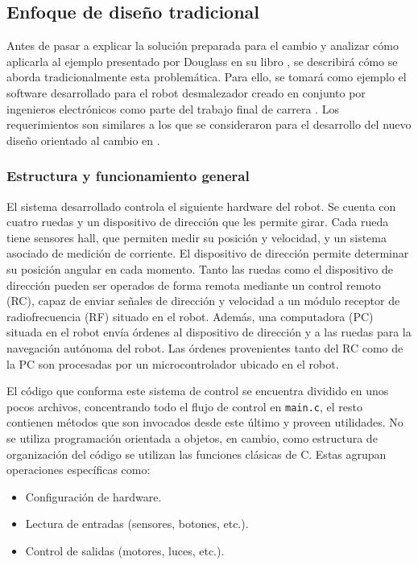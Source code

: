 \subsection*{Enfoque de diseño tradicional}

Antes de pasar a explicar la solución preparada para el cambio y analizar cómo aplicarla al ejemplo presentado por Douglass en su libro \cite{douglass}, se describirá cómo se aborda tradicionalmente esta problemática. Para ello, se tomará como ejemplo el software desarrollado para el robot desmalezador creado en conjunto por ingenieros electrónicos como parte del trabajo final de carrera \cite{disenioViejo1, disenioViejo2}. Los requerimientos son similares a los que se consideraron para el desarrollo del nuevo diseño orientado al cambio en \cite{paperPomponio}.

\subsubsection*{Estructura y funcionamiento general}

El sistema desarrollado controla el siguiente hardware del robot. Se cuenta con cuatro ruedas y un dispositivo de dirección que les permite girar. Cada rueda tiene sensores \gls{hall}, que permiten medir su posición y velocidad, y un sistema asociado de medición de corriente. El dispositivo de dirección permite determinar su posición angular en cada momento. Tanto las ruedas como el dispositivo de dirección pueden ser operados de forma remota mediante un control remoto (RC), capaz de enviar señales de dirección y velocidad a un módulo receptor de radiofrecuencia (RF) situado en el robot. Además, una computadora (PC) situada en el robot envía órdenes al dispositivo de dirección y a las ruedas para la navegación autónoma del robot. Las órdenes provenientes tanto del RC como de la PC son procesadas por un microcontrolador ubicado en el robot.

El código que conforma este sistema de control se encuentra dividido en unos pocos archivos, concentrando todo el flujo de control en \verb|main.c|, el resto contienen métodos que son invocados desde este último y proveen utilidades. No se utiliza programación orientada a objetos, en cambio, como estructura de organización del código se utilizan las funciones clásicas de C. Estas agrupan operaciones específicas como:
\begin{itemize}
\item Configuración de hardware.
\item Lectura de entradas (sensores, botones, etc.).
\item Control de salidas (motores, luces, etc.).
\end{itemize}


